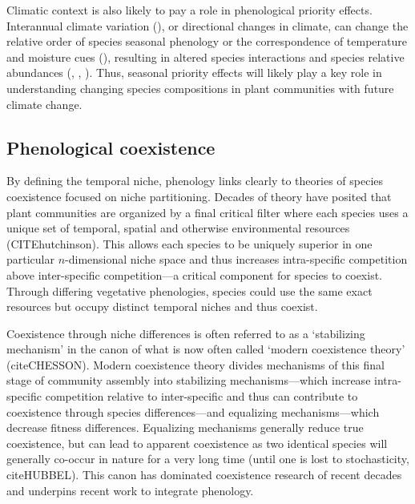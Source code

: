 \documentclass[11pt]{article}
\begin{document}
Climatic context is also likely to pay a role in phenological priority effects. Interannual climate variation (\citet{levine2011seasonal}), or directional changes in climate, can change the relative order of species seasonal phenology or the correspondence of temperature and moisture cues (\cite{kimball2010contemporary}), resulting in altered species interactions and species relative abundances (\citet{thomson2017between}, \citet{kimball2010contemporary}, \citet{buonaiuto2023contrasting}). Thus, seasonal priority effects will likely play a key role in understanding changing species compositions in plant communities with future climate change.

\subsection*{Phenological coexistence}

By defining the temporal niche, phenology links clearly to theories of species coexistence focused on niche partitioning. Decades of theory have posited that plant communities are organized by a final critical filter where each species uses a unique set of temporal, spatial and otherwise environmental resources (CITEhutchinson). This allows each species to be uniquely superior in one particular $n$-dimensional niche space and thus increases intra-specific competition above inter-specific competition---a critical component for species to coexist. Through differing vegetative phenologies, species could use the same exact resources but occupy distinct temporal niches and thus coexist. 

Coexistence through niche differences is often referred to as a `stabilizing mechanism' in the canon of what is now often called `modern coexistence theory' (citeCHESSON). Modern coexistence theory divides mechanisms of this final stage of community assembly into stabilizing mechanisms---which increase intra-specific competition relative to inter-specific and thus can contribute to coexistence through species differences---and equalizing mechanisms---which decrease fitness differences. Equalizing mechanisms generally reduce true coexistence, but can lead to apparent coexistence as two identical species will generally co-occur in nature for a very long time (until one is lost to stochasticity, citeHUBBEL). This canon has dominated coexistence research of recent decades and underpins recent work to integrate phenology.
\end{document}
